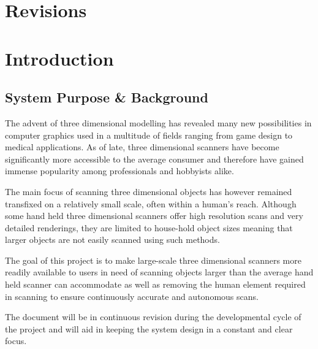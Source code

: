 \documentclass[10pt,letterpaper]{article}
\begin{document}
\listoffigures

\listoftables


\newpage


\thispagestyle{empty}

\section*{Revisions}
\vspace{1cm}
\begin{center}
\end{center}

\newpage


\section{Introduction}
\subsection{System Purpose \& Background}
The advent of three dimensional modelling has revealed many new possibilities in computer graphics used in a multitude of fields ranging from game design to medical applications. As of late, three dimensional scanners have become significantly more accessible to the average consumer and therefore have gained immense popularity among professionals and hobbyists alike. \par 
The main focus of scanning three dimensional objects has however remained transfixed on a relatively small scale, often within a human's reach. Although some hand held three dimensional scanners offer high resolution scans and very detailed renderings, they are limited to house-hold object sizes meaning that larger objects are not easily scanned using such methods. \par 
The goal of this project is to make large-scale three dimensional scanners more readily available to users in need of scanning objects larger than the average hand held scanner can accommodate as well as removing the human element required in scanning to ensure continuously accurate and autonomous scans. \par 
The document will be in continuous revision during the developmental cycle of the project and will aid in keeping the system design in a constant and clear focus.
\end{document}
